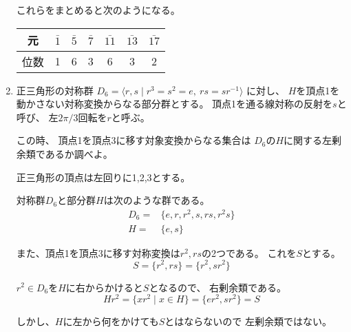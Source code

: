 \documentclass[12pt,b5paper]{ltjsarticle}
\begin{document}
\begin{enumerate}
      これらをまとめると次のようになる。
      \begin{center}
       \begin{tabular}{c|cccccc}
        元 & $\bar{1}$ & $\bar{5}$ & $\bar{7}$ & $\bar{11}$ & $\bar{13}$ & $\bar{17}$ \\
        \hline
        位数 & 1 & 6 & 3 & 6 & 3 & 2 \\
       \end{tabular}
      \end{center}

      \hrulefill
 \item
      正三角形の対称群
      $D_{6}=\langle r , s \mid r^3=s^2 =e,\ rs=sr^{-1} \rangle$
      に対し、
      $H$を頂点1を動かさない対称変換からなる部分群とする。
      頂点1を通る線対称の反射を$s$と呼び、
      左$2\pi /3$回転を$r$と呼ぶ。

      この時、
      頂点1を頂点3に移す対象変換からなる集合は
      $D_{6}$の$H$に関する左剰余類であるか調べよ。

      \dotfill

      正三角形の頂点は左回りに1,2,3とする。

      対称群$D_{6}$と部分群$H$は次のような群である。
      \begin{align}
       D_{6} =& \{ e,r,r^2,s,rs,r^2s \}\\
       H =& \{ e, s\}
      \end{align}

      また、頂点1を頂点3に移す対称変換は$r^2,rs$の2つである。
      これを$S$とする。
      \begin{equation}
       S=\{ r^2,rs\}=\{r^2,sr^2\}
      \end{equation}

      $r^2\in D_{6}$を$H$に右からかけると$S$となるので、
      右剰余類である。
      \begin{equation}
       Hr^2=\{xr^2\mid x\in H\}=\{ er^2,sr^2\}=S
      \end{equation}

      しかし、$H$に左から何をかけても$S$とはならないので
      左剰余類ではない。


      \hrulefill

\end{enumerate}
\end{document}
